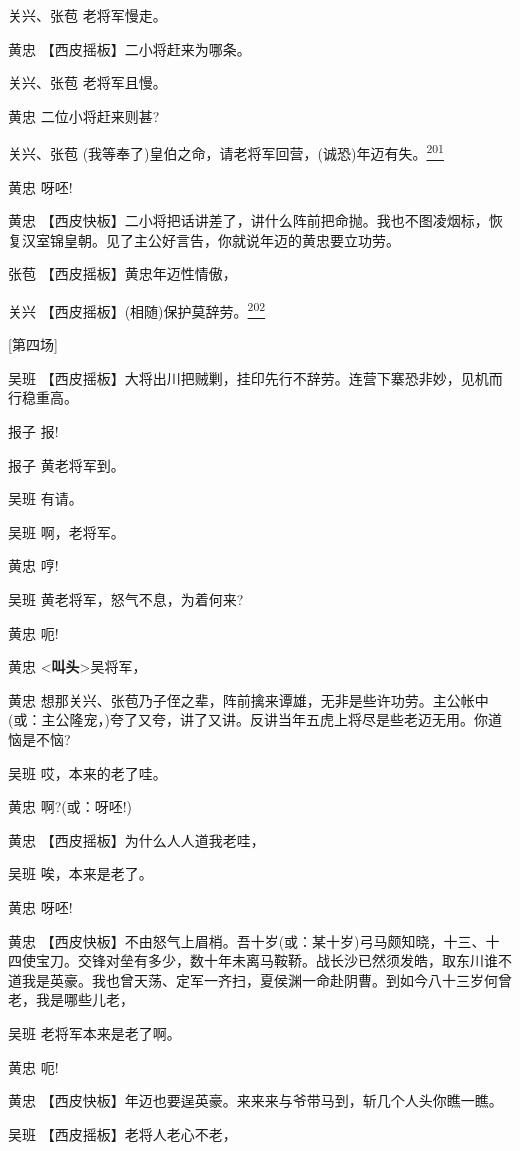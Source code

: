关兴、张苞 老将军慢走。

黄忠 【西皮摇板】二小将赶来为哪条。

关兴、张苞 老将军且慢。

黄忠 二位小将赶来则甚?

关兴、张苞
(我等奉了)皇伯之命，请老将军回营，(诚恐)年迈有失。\protect\hyperlink{fn201}{\textsuperscript{201}}

黄忠 呀呸!

黄忠
【西皮快板】二小将把话讲差了，讲什么阵前把命抛。我也不图凌烟标，恢复汉室锦皇朝。见了主公好言告，你就说年迈的黄忠要立功劳。

张苞 【西皮摇板】黄忠年迈性情傲，

关兴
【西皮摇板】(相随)保护莫辞劳。\protect\hyperlink{fn202}{\textsuperscript{202}}

{[}第四场{]}

吴班
【西皮摇板】大将出川把贼剿，挂印先行不辞劳。连营下寨恐非妙，见机而行稳重高。

报子 报!

报子 黄老将军到。

吴班 有请。

吴班 啊，老将军。

黄忠 哼!

吴班 黄老将军，怒气不息，为着何来?

黄忠 呃!

黄忠 \textless{}\textbf{叫头}\textgreater{}吴将军，

黄忠
想那关兴、张苞乃子侄之辈，阵前擒来谭雄，无非是些许功劳。主公帐中(或：主公隆宠，)夸了又夸，讲了又讲。反讲当年五虎上将尽是些老迈无用。你道恼是不恼?

吴班 哎，本来的老了哇。

黄忠 啊?(或：呀呸!)

黄忠 【西皮摇板】为什么人人道我老哇，

吴班 唉，本来是老了。

黄忠 呀呸!

黄忠
【西皮快板】不由怒气上眉梢。吾十岁(或：某十岁)弓马颇知晓，十三、十四使宝刀。交锋对垒有多少，数十年未离马鞍鞒。战长沙已然须发皓，取东川谁不道我是英豪。我也曾天荡、定军一齐扫，夏侯渊一命赴阴曹。到如今八十三岁何曾老，我是哪些儿老，

吴班 老将军本来是老了啊。

黄忠 呃!

黄忠 【西皮快板】年迈也要逞英豪。来来来与爷带马到，斩几个人头你瞧一瞧。

吴班 【西皮摇板】老将人老心不老，

